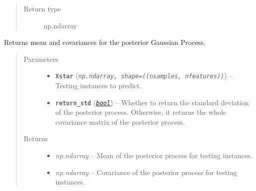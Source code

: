 \documentclass[letterpaper,10pt,english]{sphinxmanual}
\begin{document}
\begin{fulllineitems}
\begin{fulllineitems}
\begin{quote}
\begin{description}
\item[{Return type}] \leavevmode
np.ndarray

\end{description}\end{quote}

\end{fulllineitems}


\begin{fulllineitems}
\label{pyGPGO.surrogates.GaussianProcess:pyGPGO.surrogates.GaussianProcess.GaussianProcess.predict}
Returns mean and covariances for the posterior Gaussian Process.
\begin{quote}\begin{description}
\item[{Parameters}] \leavevmode\begin{itemize}
\item {} 
\textbf{\texttt{Xstar}} (\emph{\texttt{np.ndarray, shape=((nsamples, nfeatures))}}) -- Testing instances to predict.

\item {} 
\textbf{\texttt{return\_std}} (\href{https://docs.python.org/2/library/functions.html\#bool}{\emph{\texttt{bool}}}) -- Whether to return the standard deviation of the posterior process. Otherwise,
it returns the whole covariance matrix of the posterior process.

\end{itemize}

\item[{Returns}] \leavevmode
\begin{itemize}
\item {} 
\emph{np.ndarray} -- Mean of the posterior process for testing instances.

\item {} 
\emph{np.ndarray} -- Covariance of the posterior process for testing instances.

\end{itemize}


\end{description}\end{quote}

\end{fulllineitems}



\end{fulllineitems}
\end{document}
